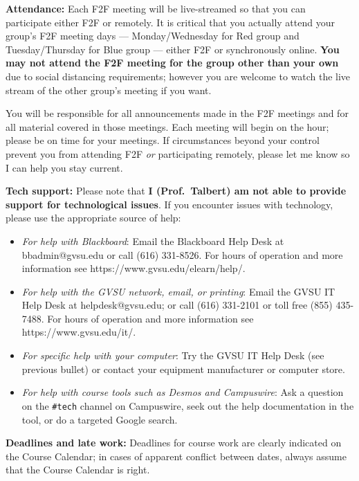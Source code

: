 \documentclass[]{article}
\providecommand{\tightlist}{%
  \setlength{\itemsep}{0pt}\setlength{\parskip}{0pt}}
\begin{document}
\textbf{Attendance:} Each F2F meeting will be live-streamed so that you
can participate either F2F or remotely. It is critical that you actually
attend your group's F2F meeting days --- Monday/Wednesday for Red group
and Tuesday/Thursday for Blue group --- either F2F or synchronously
online. \textbf{You may not attend the F2F meeting for the group other
than your own} due to social distancing requirements; however you are
welcome to watch the live stream of the other group's meeting if you
want.

You will be responsible for all announcements made in the F2F meetings
and for all material covered in those meetings. Each meeting will begin
on the hour; please be on time for your meetings. If circumstances
beyond your control prevent you from attending F2F \emph{or}
participating remotely, please let me know so I can help you stay
current.

\textbf{Tech support:} Please note that \textbf{I (Prof.~Talbert) am not
able to provide support for technological issues}. If you encounter
issues with technology, please use the appropriate source of help:

\begin{itemize}
\tightlist
\item
  \emph{For help with Blackboard}: Email the Blackboard Help Desk at
  bbadmin@gvsu.edu or call (616) 331-8526. For hours of operation and
  more information see https://www.gvsu.edu/elearn/help/.
\item
  \emph{For help with the GVSU network, email, or printing}: Email the
  GVSU IT Help Desk at helpdesk@gvsu.edu; or call (616) 331-2101 or toll
  free (855) 435-7488. For hours of operation and more information see
  https://www.gvsu.edu/it/.
\item
  \emph{For specific help with your computer}: Try the GVSU IT Help Desk
  (see previous bullet) or contact your equipment manufacturer or
  computer store.
\item
  \emph{For help with course tools such as Desmos and Campuswire}: Ask a
  question on the \texttt{\#tech} channel on Campuswire, seek out the
  help documentation in the tool, or do a targeted Google search.
\end{itemize}

\textbf{Deadlines and late work:} Deadlines for course work are clearly
indicated on the Course Calendar; in cases of apparent conflict between
dates, always assume that the Course Calendar is right.
\end{document}
